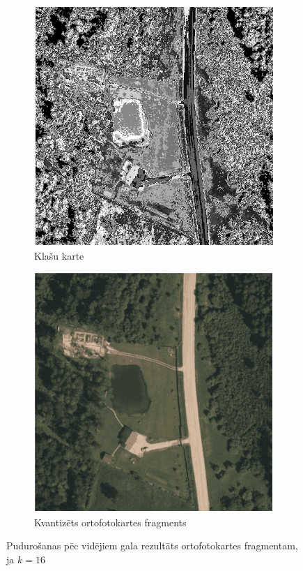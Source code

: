 \documentclass[12pt,paper=a4]{report}
\begin{document}
\begin{figure}[h!]
\centering
\begin{subfigure}[b]{.4\linewidth}
\includegraphics[width=\linewidth]{map16part}
\caption{Klašu karte}
\label{kmeans16map}
\end{subfigure}
\begin{subfigure}[b]{.4\linewidth}
\includegraphics[width=\linewidth]{ImgQ16part}
\caption{Kvantizēts ortofotokartes fragments}
\label{kmeans16imgq}
\end{subfigure}
\caption{Pudurošanas pēc vidējiem gala rezultāts ortofotokartes fragmentam, ja $k=16$}
\label{fig:kmeans16}
\end{figure}\par
\end{document}

